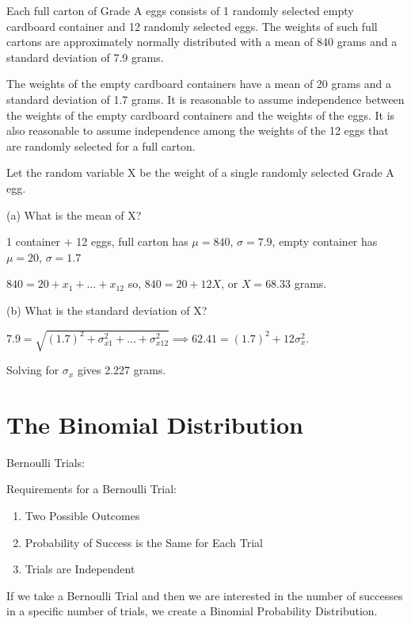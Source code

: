 \documentclass[../stats.tex]{subfiles}
\begin{document}
\begin{example}
    Each full carton of Grade A eggs consists of 1 randomly selected empty cardboard container and 12 randomly selected eggs. The weights of such full cartons are approximately normally distributed with a mean of 840 grams and a standard deviation of 7.9 grams.

    The weights of the empty cardboard containers have a mean of 20 grams and a standard deviation of 1.7 grams. It is reasonable to assume independence between the weights of the empty cardboard containers and the weights of the eggs. It is also reasonable to assume independence among the weights of the 12 eggs that are randomly selected for a full carton.

    Let the random variable X be the weight of a single randomly selected Grade A egg.

    (a) What is the mean of X?

    1 container + 12 eggs, full carton has $\mu=840$, $\sigma=7.9$, empty container has $\mu=20$, $\sigma=1.7$

    $840=20+x_1+\dots+x_{12}$ so, $840=20+12X$, or $X=68.33$ grams.

    (b) What is the standard deviation of X?

    $7.9=\sqrt{(1.7)^2+\sigma_{x1}^2+\dots+\sigma_{x12}^2} \implies 62.41 = (1.7)^2+12\sigma_x^2$.

    Solving for $\sigma_x$ gives 2.227 grams.
\end{example}

\section{The Binomial Distribution}
Bernoulli Trials:

Requirements for a Bernoulli Trial:
\begin{enumerate}
    \item Two Possible Outcomes 
    \item Probability of Success is the Same for Each Trial 
    \item Trials are Independent
\end{enumerate}

If we take a Bernoulli Trial and then we are interested in the number of successes in a specific number of trials, we create a Binomial Probability Distribution.
\end{document}
